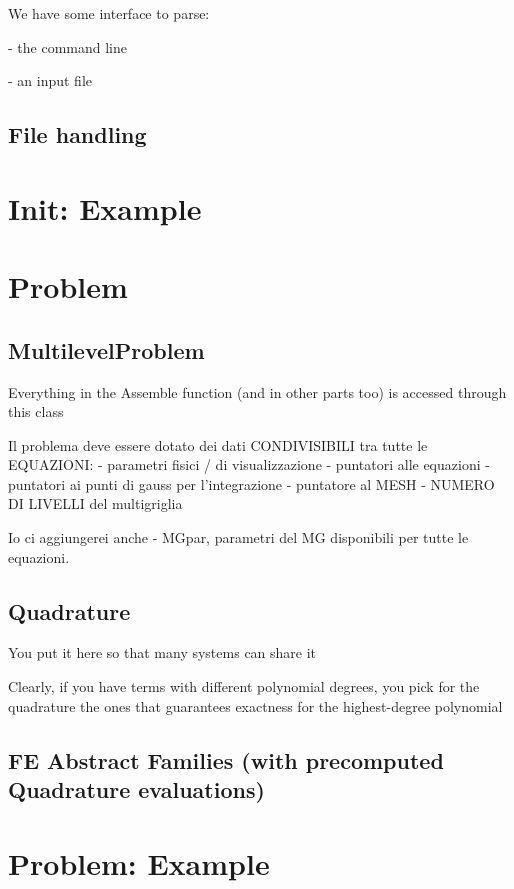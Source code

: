 \documentclass[10pt]{book}
\begin{document}
   We have some interface to parse:
   
   - the command line
   
   - an input file
   
   
    \section{File handling}

  \chapter{Init: Example}

  
  \chapter{Problem}

  
    \section{MultilevelProblem}

  Everything in the Assemble function (and in other parts too) is accessed through this class
  
Il problema deve essere dotato dei dati CONDIVISIBILI tra tutte le EQUAZIONI:
   - parametri fisici / di visualizzazione
   - puntatori alle equazioni
   - puntatori ai punti di gauss per l'integrazione
   - puntatore al MESH
   - NUMERO DI LIVELLI del multigriglia

Io ci aggiungerei anche 
   - MGpar, parametri del MG disponibili per tutte le equazioni.
   
\section{ Quadrature }

You put it here so that many systems can share it

Clearly, if you have terms with different polynomial degrees,
you pick for the quadrature the ones that guarantees exactness for the highest-degree polynomial
  
\section{FE Abstract Families (with precomputed Quadrature evaluations)}
  
  
 \chapter{Problem: Example}
  
\end{document}
